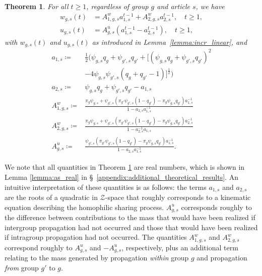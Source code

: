 \documentclass[letterpaper]{article} %
\newtheorem{theorem}{Theorem}
\begin{document}
\begin{theorem}\label{theorem:closed_form_Z_transform_of_coeffs}
For all $t\geq 1$, regardless of group $g$ and article $s$, we have
\footnotesize
\begin{align}
    w_{g,s}(t) &= 
    A^w_{1,g,s}a_{1,s}^{t-1} + A^w_{2,g,s}a_{2,s}^{t-1}, \quad  t\geq 1, \\
    u_{g,s}(t) &= 
    A^u_{g,s}(a_{1,s}^{t-1} - a_{2,s}^{t-1}), \quad  t\geq 1,
\end{align}
\normalsize
with $w_{g,s}(t)$ and $u_{g,s}(t)$ as introduced in Lemma~\ref{lemma:incr_linear}, and
\footnotesize
\begin{align*}
    a_{1,s} \coloneqq &\frac{1}{2} \Big( \psi_{g,s}q_g + \psi_{g',s}q_{g'} + \big[ (\psi_{g,s}q_g + \psi_{g',s}q_{g'})^2 \\
    &- 4 \psi_{g,s}\psi_{g',s}(q_g + q_{g'} -1) \big]^{\frac{1}{2}} \Big) \\
    a_{2,s} \coloneqq &\psi_{g,s}q_g + \psi_{g',s}q_{g'} - a_{1,s} \\
    A^w_{1,g,s} \coloneqq &\frac{ \pi_g \psi_{g,s} + \psi_{g',s}\left( \pi_{g'} \psi_{g',s}(1-q_{g'}) - \pi_g \psi_{g,s} q_{g'}\right)a_{1,s}^{-1}}{1-a_{2,s}a_{1,s}^{-1}} \\
    A^w_{2,g,s} \coloneqq &\frac{ \pi_g \psi_{g,s} + \psi_{g',s}\left( \pi_{g'} \psi_{g',s}(1-q_{g'}) - \pi_g \psi_{g,s} q_{g'}\right)a_{2,s}^{-1}}{1-a_{2,s}^{-1}a_{1,s}} \\
    A^u_{g,s} \coloneqq &\frac{ \psi_{g',s}\left( \pi_{g'} \psi_{g',s}(1-q_{g'}) - \pi_g \psi_{g,s} q_{g'}\right)a_{1,s}^{-1}}{1-a_{2,s}a_{1,s}^{-1}}.
\end{align*}
\normalsize
\end{theorem}

We note that all quantities in Theorem \ref{theorem:closed_form_Z_transform_of_coeffs} are real numbers, which is shown in Lemma \ref{lemma:as_real} in \S~\ref{appendix:additional_theoretical_results}. 
%
An intuitive interpretation of these quantities is as follows: the terms $a_{1,s}$ and $a_{2,s}$ are the roots of a quadratic in $\mathcal{Z}$-space that roughly corresponds to a kinematic equation describing the homophilic sharing process.
%
$A^u_{g,s}$ corresponds roughly to the difference between contributions to the mass that would have been realized if intergroup propagation had not occurred and those that would have been realized if intragroup propagation had not occurred.
%
The quantities $A^w_{1,g,s}$ and $A^w_{2,g,s}$ correspond roughly to $A^u_{g,s}$ and $-A^u_{g,s}$, respectively, plus an additional term relating to the mass generated by propagation \emph{within} group $g$ and propagation \emph{from} group $g'$ to $g$.
\end{document}
